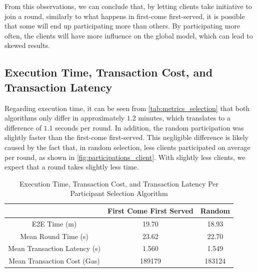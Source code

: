From this observations, we can conclude that, by letting clients take initiative to join a round, similarly to what happens in first-come first-served, it is possible that some will end up participating more than others. By participating more often, the clients will have more influence on the global model, which can lead to skewed results.

\subsection{Execution Time, Transaction Cost, and Transaction Latency}

Regarding execution time, it can be seen from  \autoref{tab:metrics_selection} that both algorithms only differ in approximately $1.2$ minutes, which translates to a difference of $1.1$ seconds per round. In addition, the random participation was slightly faster than the first-come first-served. This negligible difference is likely caused by the fact that, in random selection, less clients participated on average per round, as shown in \autoref{fig:participations_client}. With slightly less clients, we expect that a round takes slightly less time.

\begin{table}[!ht]
\begin{tabular}{c|c|c} \hline \hline
                              & First Come First Served & Random \\ \hline \hline
E2E Time (m)                   & 19.70                   & 18.93  \\ \hline
Mean Round Time (s)            & 23.62                   & 22.70  \\ \hline
Mean Transaction Latency (s)   & 1.560                   & 1.549  \\ \hline
Mean Transaction Cost (Gas)    & 189179                  & 183124 \\ \hline
\end{tabular}
\caption{Execution Time, Transaction Cost, and Transaction Latency Per Participant Selection Algorithm}
\label{tab:metrics_selection}
\end{table}

